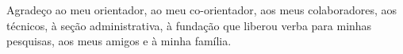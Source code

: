 \newpage


\doublespacing


Agradeço ao meu orientador, ao meu co-orientador, aos meus colaboradores, aos técnicos, à seção administrativa, à fundação que liberou verba para minhas pesquisas, aos meus amigos e à minha família.

\newpage


